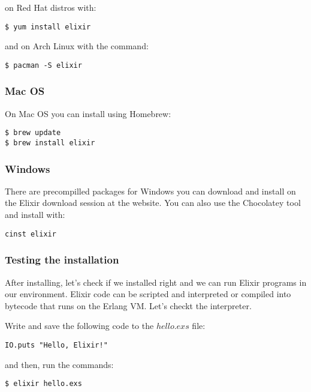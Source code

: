 on Red Hat distros with:

\begin{verbatim}
$ yum install elixir
\end{verbatim}

and on Arch Linux with the command:

\begin{verbatim}
$ pacman -S elixir
\end{verbatim}

\subsubsection{Mac OS}

On Mac OS you can install using Homebrew:

\begin{verbatim}
$ brew update
$ brew install elixir
\end{verbatim}

\subsubsection{Windows}

There are precompilled packages for Windows you can download and install on the
Elixir download session at the website. You can also use the Chocolatey tool
and install with:

\begin{verbatim}
cinst elixir
\end{verbatim}

\subsubsection{Testing the installation}

After installing, let's check if we installed right and we can run Elixir
programs in our environment. Elixir code can be scripted and interpreted or
compiled into bytecode that runs on the Erlang VM. Let's checkt the interpreter.

Write and save the following code to the $hello.exs$ file:

\begin{lstlisting}[label=ehw,caption=Elixir Hello World]
IO.puts "Hello, Elixir!"
\end{lstlisting}

and then, run the commands:

\begin{verbatim}
$ elixir hello.exs
\end{verbatim}

